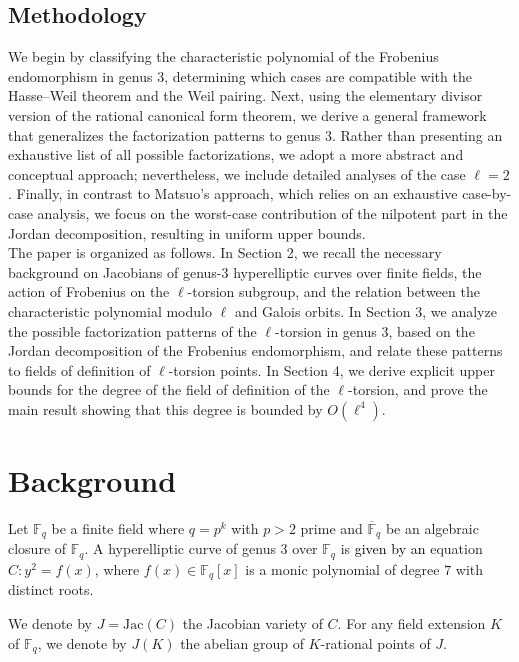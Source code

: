 \documentclass[11pt,a4paper]{article}
\theoremstyle{plain}
\theoremstyle{definition}
\theoremstyle{remark}
\newcommand{\verde}[1]{\textcolor{black}{#1}}
\begin{document}
\subsection{Methodology}
 We begin by classifying the characteristic polynomial of the Frobenius endomorphism in genus 3, determining which cases are compatible with the Hasse–Weil theorem and the Weil pairing. Next, using the elementary divisor version of the rational canonical form theorem, we derive a general framework that generalizes the factorization patterns to genus 3. Rather than presenting an exhaustive list of all possible factorizations, we adopt a more abstract and conceptual approach; nevertheless, we include detailed analyses of the case $\ell=2$.
Finally, in contrast to Matsuo’s approach, which relies on an exhaustive case-by-case analysis, we focus on the worst-case contribution of the nilpotent part in the Jordan decomposition, resulting in uniform upper bounds.\\
 The paper is organized as follows. In Section 2, we recall the necessary background on Jacobians of genus-3 hyperelliptic curves over finite fields, the action of Frobenius on the $\ell$-torsion subgroup, and the relation between the characteristic polynomial modulo $\ell$ and Galois orbits. In Section 3, we analyze the possible factorization patterns of the $\ell$-torsion in genus 3, based on the Jordan decomposition of the Frobenius endomorphism, and relate these patterns to fields of definition of $\ell$-torsion points.
In Section 4, we derive explicit upper bounds for the degree of the field of definition of the $\ell$-torsion, and prove the main result showing that this degree is bounded by $O(\ell^4)$.


\section{Background}


 Let \( \mathbb{F}_q \) be a finite field where $q=p^k$ with $p>2$ prime and \( \overline{\mathbb{F}}_q \) be an algebraic closure of \( \mathbb{F}_q \).
A hyperelliptic curve of genus \( 3 \) over \( \mathbb{F}_q \) is \verde {given by an} equation \( C :y^2=f(x)\), where $f(x)\in \mathbb{F}_q[x]$ is a monic polynomial of degree $7$ with distinct roots.

We denote by \( J = \mathrm{Jac}(C) \) the Jacobian variety of $C$. For any field extension $K$ of $\mathbb{F}_q$, we denote by $J(K)$ the abelian group of $K$-rational points of $J$. 
\end{document}
